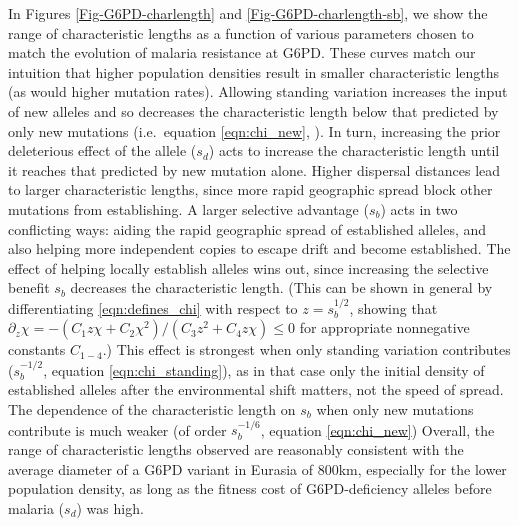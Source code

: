 \documentclass{article}
\begin{document}
In Figures \ref{Fig-G6PD-charlength} and \ref{Fig-G6PD-charlength-sb}, we show the range of characteristic lengths as a function 
of various parameters chosen to match the evolution of malaria
resistance at G6PD. 
These curves match our intuition that higher population densities result in
smaller characteristic lengths (as would higher mutation rates). 
Allowing standing variation increases the 
input of new alleles and so decreases the characteristic length below that predicted
by only new mutations (i.e.\ equation \eqref{eqn:chi_new}, \citet{ralphcoop2010}).
In turn, increasing the prior deleterious effect of the allele ($s_d$)
acts to increase the
characteristic length until it reaches that predicted by new mutation alone. 
Higher dispersal distances lead to larger characteristic lengths, 
since more rapid geographic spread block other mutations from establishing. 
A larger selective advantage ($s_b$) acts in two conflicting
ways: aiding the rapid geographic spread of established alleles, and also helping more independent copies
to escape drift and become established. 
The effect of helping locally establish alleles wins out, since increasing the selective benefit $s_b$ decreases the characteristic length. 
 (This can be shown in general by differentiating \eqref{eqn:defines_chi} with respect to $z=s_b^{1/2}$,
showing that $\partial_{z} \chi = - ( C_1 z \chi + C_2 \chi^2 )/(C_3 z^2 + C_4 z \chi ) \le 0$ for appropriate nonnegative constants $C_{1-4}$.) 
This effect is strongest when only standing variation contributes ($s_b^{-1/2}$, equation \eqref{eqn:chi_standing}), 
as in that case only the initial density of established alleles after the environmental shift matters,
not the speed of spread.
The dependence of the characteristic length on $s_b$ when only new
mutations contribute is much weaker (of order $s_b^{-1/6}$, equation \eqref{eqn:chi_new})
Overall, the range of characteristic lengths observed are reasonably
consistent with the average diameter of a G6PD variant in Eurasia of
800km, especially for the lower population density, as long as the
fitness cost of G6PD-deficiency alleles before malaria ($s_d$) was high. 
\end{document}
